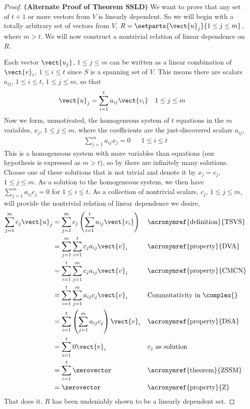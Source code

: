 \begin{proof} {\bf (Alternate Proof of Theorem SSLD)}
We want to prove that any set of $t+1$ or more vectors from $V$ is linearly dependent.  So we will begin with a totally arbitrary set of vectors from $V$, $R=\setparts{\vect{u}_j}{1\leq j\leq m}$, where $m>t$.  We will now construct a nontrivial relation of linear dependence on $R$.\par
%
Each vector $\vect{u_j}$, $1\leq j\leq m$ can be written as a linear combination of $\vect{v}_i$, $1\leq i\leq t$ since $S$ is a spanning set of $V$.  This means there are scalars  $a_{ij}$, $1\leq i\leq t$, $1\leq j\leq m$, so that
%
\begin{align*}
\vect{u}_j&=\sum_{i=1}^{t}a_{ij}\vect{v_i}&&1\leq j\leq m
\end{align*}
%
Now we form, unmotivated, the homogeneous system of $t$ equations in the $m$ variables, $x_j$, $1\leq j\leq m$, where the coefficients are the just-discovered scalars $a_{ij}$,
%
\begin{align*}
\sum_{j=1}^{m}a_{ij}x_j=0&&1\leq i\leq t
\end{align*}
%
This is a homogeneous system with more variables than equations (our hypothesis is expressed as $m>t$), so by  there are infinitely many solutions.  Choose one of these solutions that is not trivial and denote it by $x_j=c_j$, $1\leq j\leq m$.  As a solution to the homogeneous system, we then have $\sum_{j=1}^{m}a_{ij}c_{j}=0$ for $1\leq i\leq t$.  As a collection of nontrivial scalars, $c_j$, $1\leq j\leq m$, will provide the nontrivial relation of linear dependence we desire,
%
\begin{align*}
\sum_{j=1}^{m}c_{j}\vect{u}_j
&=\sum_{j=1}^{m}c_{j}\left(\sum_{i=1}^{t}a_{ij}\vect{v_i}\right)
&&\text{\acronymref{definition}{TSVS}}\\
%
&=\sum_{j=1}^{m}\sum_{i=1}^{t}c_{j}a_{ij}\vect{v}_i
&&\text{\acronymref{property}{DVA}}\\
%
&=\sum_{i=1}^{t}\sum_{j=1}^{m}c_{j}a_{ij}\vect{v}_i
&&\text{\acronymref{property}{CMCN}}\\
%
&=\sum_{i=1}^{t}\sum_{j=1}^{m}a_{ij}c_{j}\vect{v}_i
&&\text{Commutativity in $\complex{}$}\\
%
&=\sum_{i=1}^{t}\left(\sum_{j=1}^{m}a_{ij}c_{j}\right)\vect{v}_i
&&\text{\acronymref{property}{DSA}}\\
%
&=\sum_{i=1}^{t}0\vect{v}_i
&&\text{$c_j$ as solution}\\
%
&=\sum_{i=1}^{t}\zerovector
&&\text{\acronymref{theorem}{ZSSM}}\\
%
&=\zerovector
&&\text{\acronymref{property}{Z}}
%
\end{align*}
%
That does it.  $R$ has been undeniably shown to be a linearly dependent set.
\end{proof}
